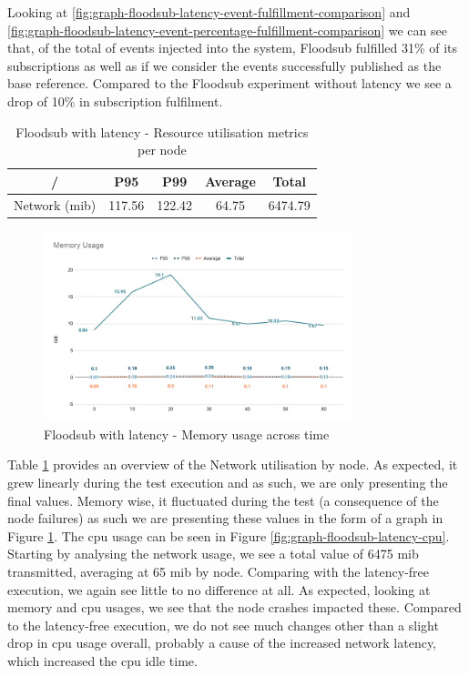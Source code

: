 Looking at \ref{fig:graph-floodsub-latency-event-fulfillment-comparison} and
\ref{fig:graph-floodsub-latency-event-percentage-fulfillment-comparison} we can
see that, of the total of events injected into the system, Floodsub fulfilled
31\% of its subscriptions as well as if we consider the events successfully
published as the base reference. Compared to the Floodsub experiment without
latency we see a drop of 10\% in subscription fulfilment.

\begin{table}[!htb]
\caption{Floodsub with latency - Resource utilisation metrics per node}
\label{table:floodsub-latency}
  \begin{center}
   \begin{tabular}{|c| c c c c|} 
   \hline
   / & P95 & P99 & Average & Total \\ [0.5ex] 
   \hline\hline
   Network (\acrshort{mib}) & 117.56 & 122.42 & 64.75 & 6474.79 \\
   \hline
  \end{tabular}
  \end{center}
\end{table}

\begin{figure}[!htb]
  \centering
  \includegraphics[width=0.8\textwidth]{img/graph-floodsub-latency-memory.png}
  \caption{Floodsub with latency - Memory usage across time}
  \label{fig:graph-floodsub-latency-memory}
\end{figure}

Table \ref{table:floodsub-latency} provides an overview of the Network
utilisation by node. As expected, it grew linearly during the test execution
and as such, we are only presenting the final values. Memory wise, it
fluctuated during the test (a consequence of the node failures) as such we are
presenting these values in the form of a graph in Figure
\ref{fig:graph-floodsub-latency-memory}.  The \acrshort{cpu} usage can be seen
in Figure \ref{fig:graph-floodsub-latency-cpu}. Starting by analysing the network
usage, we see a total value of 6475 \acrshort{mib} transmitted, averaging at 65
\acrshort{mib} by node.  Comparing with the latency-free execution, we again
see little to no difference at all. As expected, looking at memory and
\acrshort{cpu} usages, we see that the node crashes impacted these. Compared to
the latency-free execution, we do not see much changes other than a slight drop
in \acrshort{cpu} usage overall, probably a cause of the increased network
latency, which increased the \acrshort{cpu} idle time.

